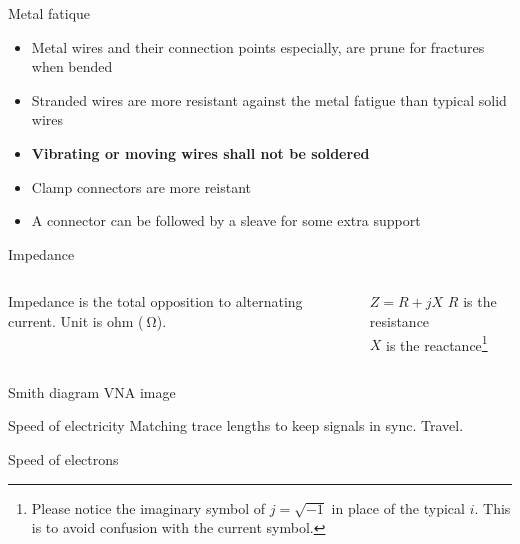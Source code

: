\documentclass{beamer}
\begin{document}
\begin{frame}[label=fatique]{Metal fatique}
 \begin{itemize}
  \item Metal wires and their connection points especially, are prune for fractures when bended
  \item Stranded wires are more resistant against the metal fatigue than typical solid wires
  \item \textbf{Vibrating or moving wires shall not be soldered}
  \item Clamp connectors are more reistant
  \item A connector can be followed by a sleave for some extra support
 \end{itemize}
\end{frame}

\begin{frame}[label=impedance]{Impedance}
\begin{columns}
  \begin{column}{0.48\textwidth}
    Impedance is the total opposition to alternating current. Unit is ohm ($\SI{}{\ohm}$).
  \end{column}
  \begin{column}{0.48\textwidth}
    \begin{block}{$Z = R + jX$}
        $R$ is the resistance \\
        $X$ is the reactance\footnote{Please notice the imaginary symbol of $j = \sqrt{-1}$ in place of the typical $i$. This is to avoid confusion with the current symbol.}
    \end{block}
  \end{column}
\end{columns}
\end{frame}

\begin{frame}{Smith diagram}
VNA image
\end{frame}

\begin{frame}{Speed of electricity}
Matching trace lengths to keep signals in sync.
Travel.~\cite{horowitz2020art}
\end{frame}

\begin{frame}{Speed of electrons}

\end{frame}
\end{document}
